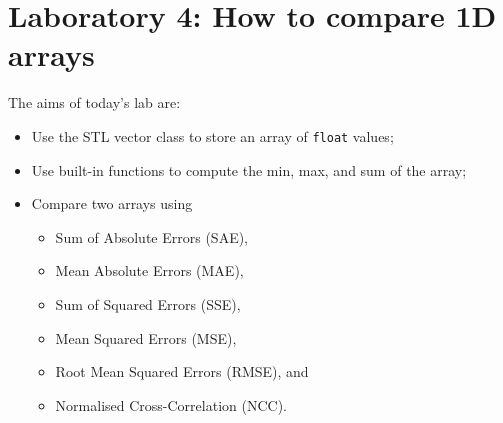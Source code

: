 \documentclass[english,a4paper,12pt,oneside]{article}
\begin{document}

\section*{Laboratory 4: How to compare 1D arrays}

%
%
%
%    
%    

The aims of today's lab are:
\begin{itemize}
	\item Use the STL vector class to store an array of \verb+float+ values;
	\item Use built-in functions to compute the min, max, and sum of the array;
	\item Compare two arrays using 
	\begin{itemize}
	        	\item Sum of Absolute Errors (SAE), 
	        	\item Mean Absolute Errors (MAE), 
		\item Sum of Squared Errors (SSE),
		\item Mean Squared Errors (MSE),
		\item Root Mean Squared Errors (RMSE),  and 
		\item Normalised Cross-Correlation (NCC).
    \end{itemize}
\end{itemize}
\end{document}
